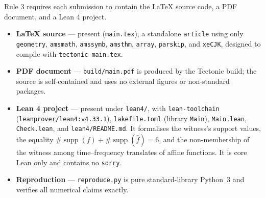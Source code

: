\documentclass[11pt]{article}
\theoremstyle{definition}
\theoremstyle{remark}
\newcommand{\supp}{\operatorname{supp}}
\newcommand{\fh}{\widehat{f}}
\begin{document}
Rule 3 requires each submission to contain the LaTeX source code, a PDF
document, and a Lean 4 project.

\begin{itemize}\sloppy
\item \textbf{LaTeX source} --- present (\texttt{main.tex}), a standalone
\texttt{article} using only \texttt{geometry}, \texttt{amsmath},
\texttt{amssymb}, \texttt{amsthm}, \texttt{array}, \texttt{parskip}, and
\texttt{xeCJK}, designed to compile with \texttt{tectonic main.tex}.
\item \textbf{PDF document} --- \texttt{build/main.pdf} is produced by the
Tectonic build; the source is self-contained and uses no external figures or
non-standard packages.
\item \textbf{Lean 4 project} --- present under \texttt{lean4/}, with
\texttt{lean-toolchain} (\texttt{leanprover\allowbreak/lean4\allowbreak:v4.33.1}),
\texttt{lakefile.toml} (library \texttt{Main}), \texttt{Main.lean},
\texttt{Check.lean}, and \texttt{lean4/README.md}. It formalises the witness's
support values, the equality $\#\supp(f)+\#\supp(\fh)=6$, and the
non-membership of the witness among time--frequency translates of affine
functions. It is core Lean only and contains no \texttt{sorry}.
\item \textbf{Reproduction} --- \texttt{reproduce.py} is pure standard-library
Python~3 and verifies all numerical claims exactly.
\end{itemize}
\end{document}
